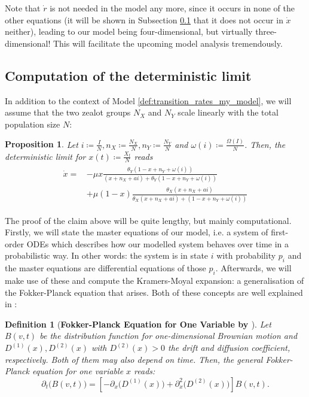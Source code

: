 \documentclass[12pt,a4paper,twoside]{article}
\newtheorem{definition}{Definition}[section]
\newtheorem{prop}{Proposition}[section]
\begin{document}
Note that $\dot{r}$ is not needed in the model any more, since it occurs in none of the other equations (it will be shown in Subsection \ref{subsec:det_lim_comp} that it does not occur in $\dot{x}$ neither), leading to our model being four-dimensional, but virtually three-dimensional! This will facilitate the upcoming model analysis tremendously. 

\subsection{Computation of the deterministic limit}\label{subsec:det_lim_comp}
In addition to the context of Model \ref{def:transition_rates_my_model}, we will assume that the two zealot groups $N_X$ and $N_Y$ scale linearly with the total population size $N$:

\begin{prop}\label{prop:det_limit_my_model_main}
	Let $i \coloneqq \frac{I}{N}, n_X \coloneqq \frac{N_X}{N}, n_Y \coloneqq \frac{N_Y}{N}$ and $\omega\left(i\right)\coloneqq \frac{\Omega\left(I\right)}{N}$. Then, the deterministic limit for $x\left(t\right) \coloneqq \frac{X_t}{N}$ reads
	\begin{align}\label{prop:det_limit_my_model}
	\begin{split}
	\dot{x} = &-\mu x\frac{\theta_Y(1-x+n_Y+\omega\left(i\right))}{(x+n_X+ai) + \theta_Y(1-x+n_Y+\omega\left(i\right))}\\
	\qquad&+ \mu \left(1-x\right)\frac{\theta_X (x+ n_X+ ai)}{\theta_X (x + n_X + ai) + (1-x + n_Y + \omega\left(i\right))}
	\end{split}
	\end{align}
\end{prop}

The proof of the claim above will be quite lengthy, but mainly computational. Firstly, we will state the master equations of our model, i.e. a system of first-order \acp{ODE} which describes how our modelled system behaves over time in a probabilistic way. In other words: the system is in state $i$ with probability $p_i$ and the master equations are differential equations of those $p_i$. Afterwards, we will make use of these and compute the Kramers-Moyal expansion: a generalisation of the Fokker-Planck equation that arises. Both of these concepts are well explained in \cite{Risken1989}:

\begin{definition}[\textbf{Fokker-Planck Equation for One Variable by \cite{Risken1989}}]
	Let $B\left(v,t\right)$ be the distribution function for one-dimensional Brownian motion and $D^{(1)}(x),D^{(2)}(x)$ with $D^{(2)}(x) > 0$ the drift and diffusion coefficient, respectively. Both of them may also depend on time. Then, the general Fokker-Planck equation for one variable $x$ reads:
	\begin{equation*}
		\partial_t\big(B\left(v,t\right)\big) = \left[-\partial_x\big(D^{(1)}(x)\big) + \partial_x^2\big(D^{(2)}(x)\big)\right] B\left(v,t\right).
	\end{equation*}
\end{definition}
\end{document}
